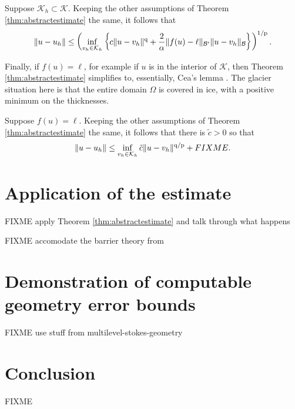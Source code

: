 \documentclass[hidelinks,onefignum,onetabnum,final]{siamart220329}  %
\newcommand{\cB}{\mathcal{B}}
\newcommand{\cK}{\mathcal{K}}
\newcommand{\pp}{{\text{\textnormal{p}}}}
\newcommand{\qq}{{\text{\textnormal{q}}}}
\begin{document}
\begin{corollary}  \label{cor:abstractestimate:equalsets}  Suppose $\cK_h \subset \cK$.  Keeping the other assumptions of Theorem \ref{thm:abstractestimate} the same, it follows that
\begin{equation}
\|u-u_h\| \le \left(\inf_{v_h\in\cK_h} \left\{c \|u - v_h\|^\qq + \frac{2}{\alpha} \|f(u)-\ell\|_{\cB'} \|u-v_h\|_{\cB}\right\}\right)^{1/\pp}. \label{eq:abstractestimate:equalsets}
\end{equation}
\end{corollary}

Finally, if $f(u)=\ell$, for example if $u$ is in the interior of $\cK$, then Theorem \ref{thm:abstractestimate} simplifies to, essentially, Cea's lemma \cite{Ciarlet2002}.  The glacier situation here is that the entire domain $\Omega$ is covered in ice, with a positive minimum on the thicknesses.

\begin{corollary}  \label{cor:abstractestimate:interior}
Suppose $f(u)=\ell$.  Keeping the other assumptions of Theorem \ref{thm:abstractestimate} the same, it follows that there is $\tilde c>0$ so that
\begin{equation}
\|u-u_h\| \le \inf_{v_h\in\cK_h} \tilde c \|u - v_h\|^{\qq/\pp} + FIXME. \label{eq:abstractestimate:interior}
\end{equation}
\end{corollary}


\section{Application of the estimate} \label{sec:application}

FIXME apply Theorem \ref{thm:abstractestimate} and talk through what happens

FIXME accomodate the barrier theory from \cite{Bueler2021conservation}


\section{Demonstration of computable geometry error bounds} \label{sec:demo}

FIXME use stuff from multilevel-stokes-geometry


\section{Conclusion} \label{sec:conclusion}

FIXME




\end{document}
